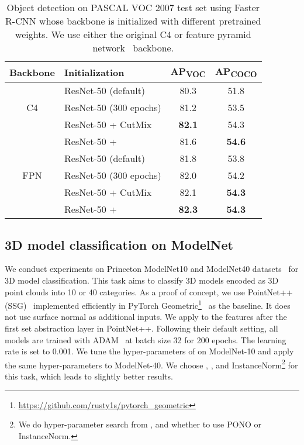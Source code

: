 \documentclass[final]{cvpr}
\begin{document}
\begin{table}[h]
    \centering
    \small
\begin{tabular}{c|l|c|c}
    \toprule
    Backbone & Initialization & AP\textsubscript{VOC} & AP\textsubscript{COCO} \\
    \midrule
    \multirow{3}{*}{C4}
    & ResNet-50 (default)  & 80.3  & 51.8 \\
    & ResNet-50 (300 epochs) & 81.2 & 53.5\\
    & ResNet-50 + CutMix & \textbf{82.1} & 54.3 \\
    & ResNet-50 + \methodname{} & 81.6 & \textbf{54.6} \\
    \midrule
    \multirow{3}{*}{FPN}
    & ResNet-50 (default) & 81.8 & 53.8 \\
    & ResNet-50 (300 epochs) & 82.0 & 54.2 \\
    & ResNet-50 + CutMix & 82.1 & \textbf{54.3}  \\
    & ResNet-50 + \methodname{} & \textbf{82.3} & \textbf{54.3} \\
    \bottomrule
\end{tabular}
\caption{Object detection on PASCAL VOC 2007 test set using Faster R-CNN whose backbone is initialized with different pretrained weights. We use either the original C4 or feature pyramid network~\citep{lin2017feature} backbone.}
\label{tab:voc}     \vspace{-0.15in}
\end{table}

\subsection{3D model classification on ModelNet}
\label{subsec:modelnet}
We conduct experiments on Princeton ModelNet10 and ModelNet40 datasets~\cite{wu20153d} for 3D model classification. This task aims to classify 3D models encoded as 3D point clouds into 10 or 40 categories. As a proof of concept, we use PointNet++ (SSG)~\cite{qi2017pointnet++} implemented efficiently in PyTorch Geometric\footnote{\href{https://github.com/rusty1s/pytorch_geometric/blob/master/examples/pointnet2_classification.py}{https://github.com/rusty1s/pytorch\_geometric}}~\cite{Fey/Lenssen/2019} as the baseline. It does not use surface normal as additional inputs.
We apply \methodname{} to the features after the first set abstraction layer in PointNet++. Following their default setting, all models are trained with ADAM~\cite{kingma2014adam} at batch size 32 for 200 epochs. The learning rate is set to 0.001. We tune the hyper-parameters of \methodname{} on ModelNet-10 and apply the same hyper-parameters to ModelNet-40.  We choose , , and InstanceNorm\footnote{We do hyper-parameter search from ,  and whether to use PONO or InstanceNorm. } for this task, which leads to slightly better results. 
\end{document}
